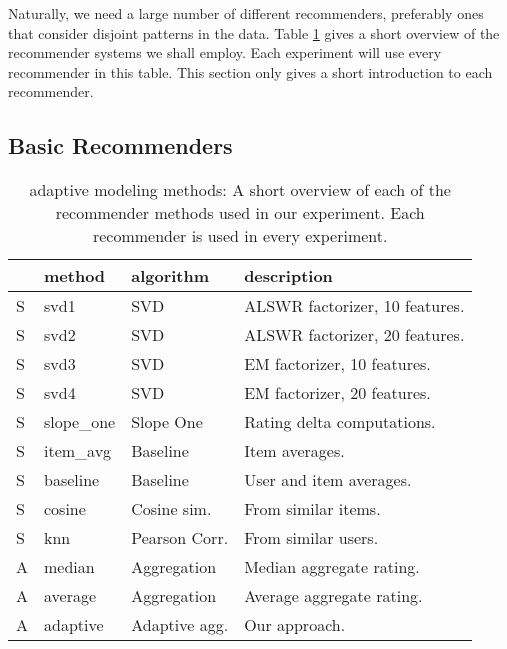 Naturally, we need a large number of different recommenders, preferably ones that consider
disjoint patterns in the data. Table \ref{table:results:methods}
gives a short overview of the recommender systems we shall employ.
Each experiment will use every recommender in this table.
This section only gives a short introduction to each recommender.

\subsection{Basic Recommenders}

\begin{table}
  \caption[Adaptive Modeling Methods]{
    adaptive modeling methods: A short overview of each of the recommender methods
    used in our experiment.
    Each recommender is used in every experiment. 
  }
  \setlength{\extrarowheight}{0.2em}
  \vspace{1em}
  \begin{tabular*}{0.48\textwidth}{ l l l l }
    \hline
    { } & \textbf{method} & \textbf{algorithm} & \textbf{description} \\
    \hline
    S & svd1          & SVD                   & ALSWR factorizer, 10 features. \\
    S & svd2          & SVD                   & ALSWR factorizer, 20 features. \\
    S & svd3          & SVD                   & EM factorizer, 10 features. \\
    S & svd4          & SVD                   & EM factorizer, 20 features. \\
    S & slope\_one    & Slope One             & Rating delta computations. \\
    S & item\_avg     & Baseline              & Item averages. \\ 
    S & baseline      & Baseline              & User and item averages.\\ 
    S & cosine   	    & Cosine sim.           & From similar items.\\ 
    S & knn       	  & Pearson Corr.         & From similar users.\\
    \hline
    A & median    	  & Aggregation           & Median aggregate rating. \\
    A & average    	  & Aggregation           & Average aggregate rating. \\
    A & adaptive      & Adaptive agg.         & Our approach. \\
    \hline
  \end{tabular*}
  \label{table:results:methods}
\end{table}

